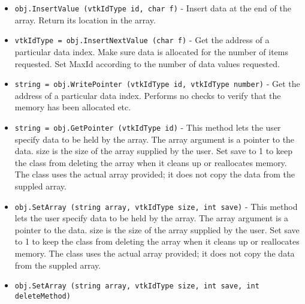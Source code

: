 \begin{itemize}
\item  \verb|obj.InsertValue (vtkIdType id, char f)| -  Insert data at the end of the array. Return its location in the array.

\item  \verb|vtkIdType = obj.InsertNextValue (char f)| -  Get the address of a particular data index. Make sure data is allocated
 for the number of items requested. Set MaxId according to the number of
 data values requested.

\item  \verb|string = obj.WritePointer (vtkIdType id, vtkIdType number)| -  Get the address of a particular data index. Performs no checks
 to verify that the memory has been allocated etc.

\item  \verb|string = obj.GetPointer (vtkIdType id)| -  This method lets the user specify data to be held by the array.  The
 array argument is a pointer to the data.  size is the size of
 the array supplied by the user.  Set save to 1 to keep the class
 from deleting the array when it cleans up or reallocates memory.
 The class uses the actual array provided; it does not copy the data
 from the suppled array. 

\item  \verb|obj.SetArray (string array, vtkIdType size, int save)| -  This method lets the user specify data to be held by the array.  The
 array argument is a pointer to the data.  size is the size of
 the array supplied by the user.  Set save to 1 to keep the class
 from deleting the array when it cleans up or reallocates memory.
 The class uses the actual array provided; it does not copy the data
 from the suppled array. 

\item  \verb|obj.SetArray (string array, vtkIdType size, int save, int deleteMethod)|

\end{itemize}
